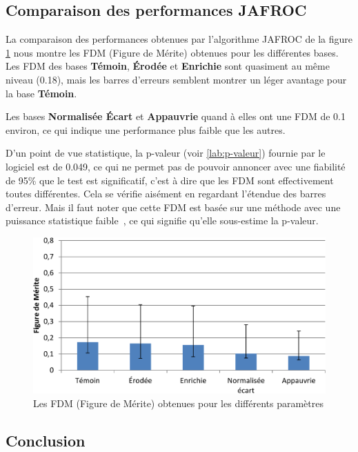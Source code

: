 \subsection{Comparaison des performances JAFROC}

La comparaison des performances obtenues par l'algorithme JAFROC \cite{chakraborty1990free} de la figure \ref{lab:fom_param} nous montre les FDM (Figure de Mérite) obtenues pour les différentes bases. Les FDM des bases \textbf{Témoin}, \textbf{Érodée} et \textbf{Enrichie} sont quasiment au même niveau (0.18), mais les barres d'erreurs semblent montrer un léger avantage pour la base \textbf{Témoin}.

Les bases \textbf{Normalisée Écart} et \textbf{Appauvrie} quand à elles ont une FDM de 0.1 environ, ce qui indique une performance plus faible que les autres.

D'un point de vue statistique, la p-valeur (voir \ref{lab:p-valeur}) fournie par le logiciel est de 0.049, ce qui ne permet pas de pouvoir annoncer avec une fiabilité de 95\% que le test est significatif, c'est à dire que les FDM sont effectivement toutes différentes. Cela se vérifie aisément en regardant l'étendue des barres d'erreur. Mais il faut noter que cette FDM est basée sur une méthode avec une puissance statistique faible~\cite{chakraborty2004observer}, ce qui signifie qu'elle sous-estime la p-valeur.

\begin{figure}[h!]
 \begin{center}
   \includegraphics[width=15cm]{images/FOM_param}
 \end{center}
 \caption{Les FDM (Figure de Mérite) obtenues pour les différents paramètres}
 \label{lab:fom_param}
\end{figure}

\subsection{Conclusion}

